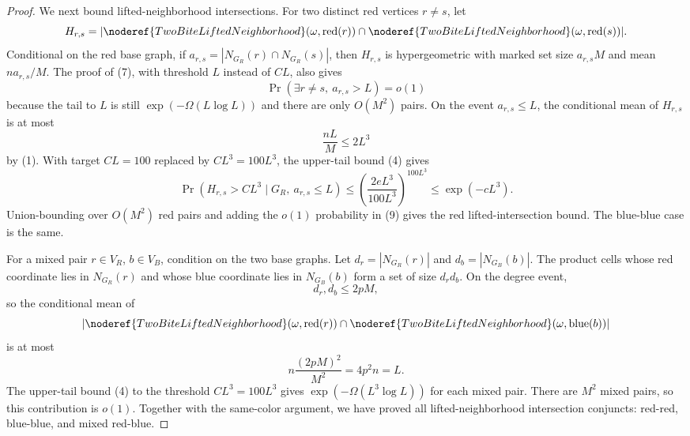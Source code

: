 \begin{proof}
We next bound lifted-neighborhood intersections.  For two distinct red
vertices \(r\ne s\), let
\[
H_{r,s}=
|\noderef{TwoBiteLiftedNeighborhood}(\omega,\operatorname{red}(r))
 \cap
 \noderef{TwoBiteLiftedNeighborhood}(\omega,\operatorname{red}(s))|.
\]
Conditional on the red base graph, if \(a_{r,s}=|N_{G_R}(r)\cap N_{G_R}(s)|\),
then \(H_{r,s}\) is hypergeometric with marked set size \(a_{r,s}M\) and mean
\(n a_{r,s}/M\).  The proof of (7), with threshold \(L\) instead of
\(CL\), also gives
\[
\Pr(\exists r\ne s,\ a_{r,s}>L)=o(1)
\tag{9}
\]
because the tail to \(L\) is still \(\exp(-\Omega(L\log L))\) and there are
only \(O(M^2)\) pairs.  On the event \(a_{r,s}\le L\), the conditional mean
of \(H_{r,s}\) is at most
\[
\frac{nL}{M}\le 2L^3
\]
by (1).  With target \(CL=100\) replaced by \(C L^3=100L^3\), the upper-tail
bound (4) gives
\[
\Pr(H_{r,s}>C L^3\mid G_R,\ a_{r,s}\le L)
\le \left(\frac{2eL^3}{100L^3}\right)^{100L^3}
\le \exp(-cL^3).
\]
Union-bounding over \(O(M^2)\) red pairs and adding the \(o(1)\) probability
in (9) gives the red lifted-intersection bound.  The blue-blue case is the
same.

For a mixed pair \(r\in V_R\), \(b\in V_B\), condition on the two base graphs.
Let \(d_r=|N_{G_R}(r)|\) and \(d_b=|N_{G_B}(b)|\).  The product cells whose
red coordinate lies in \(N_{G_R}(r)\) and whose blue coordinate lies in
\(N_{G_B}(b)\) form a set of size \(d_rd_b\).  On the degree event,
\[
d_r,d_b\le 2pM,
\]
so the conditional mean of
\[
|\noderef{TwoBiteLiftedNeighborhood}(\omega,\operatorname{red}(r))
 \cap
 \noderef{TwoBiteLiftedNeighborhood}(\omega,\operatorname{blue}(b))|
\]
is at most
\[
n\frac{(2pM)^2}{M^2}=4p^2n=L.
\]
The upper-tail bound (4) to the threshold \(C L^3=100L^3\) gives
\(\exp(-\Omega(L^3\log L))\) for each mixed pair.  There are \(M^2\) mixed
pairs, so this contribution is \(o(1)\).  Together with the same-color
argument, we have proved all lifted-neighborhood intersection conjuncts:
red-red, blue-blue, and mixed red-blue.


\end{proof}
